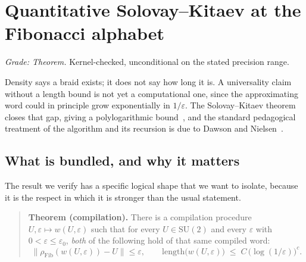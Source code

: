 \documentclass[aps,prx,nofootinbib,superscriptaddress,12pt]{revtex4-2}
\begin{document}

\section{Quantitative Solovay--Kitaev at the Fibonacci alphabet}
\label{sec:sk}

\emph{Grade: Theorem.} Kernel-checked, unconditional on the stated
precision range.

Density says a braid exists; it does not say how long it is. A universality
claim without a length bound is not yet a computational one, since the
approximating word could in principle grow exponentially in
$1/\varepsilon$. The Solovay--Kitaev theorem closes that gap, giving a
polylogarithmic bound~\cite{KitaevShenVyalyi2002}, and the standard
pedagogical treatment of the algorithm and its recursion is due to
Dawson and Nielsen~\cite{DawsonNielsen2006}.

\subsection{What is bundled, and why it matters}

The result we verify has a specific logical shape that we want to
isolate, because it is the respect in which it is stronger than the
usual statement.

\begin{quote}
\textbf{Theorem (compilation).} There is a compilation procedure
$U, \varepsilon \mapsto w(U,\varepsilon)$ such that for every
$U \in \mathrm{SU}(2)$ and every $\varepsilon$ with
$0 < \varepsilon \le \varepsilon_0$, \emph{both} of the following hold of
that same compiled word:
\[
\bigl\lVert \rho_{\mathrm{Fib}}(w(U,\varepsilon)) - U \bigr\rVert \le \varepsilon,
\qquad
\mathrm{length}\bigl(w(U,\varepsilon)\bigr) \;\le\;
C \,\bigl(\log(1/\varepsilon)\bigr)^{c}.
\]
\end{quote}
\end{document}
